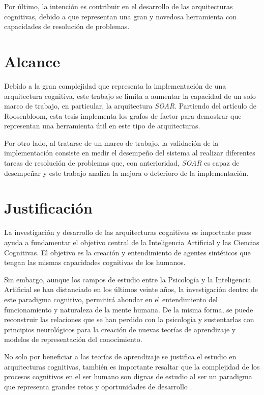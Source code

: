 Por \'{u}ltimo, la intenci\'{o}n es contribuir en el desarrollo de las arquitecturas cognitivas, debido a que representan una gran y novedosa herramienta \cite{langley1991design} con capacidades de resoluci\'{o}n de problemas. 

\section{Alcance}

Debido a la gran complejidad que representa la implementaci\'{o}n de una arquitectura cognitiva, este trabajo se limita a aumentar la capacidad de un solo marco de trabajo, en particular, la arquitectura \emph{SOAR}. Partiendo del art\'{i}culo de Roosenbloom, esta tesis implementa los grafos de factor para demostrar que representan una herramienta \'{u}til en este tipo de arquitecturas. 

Por otro lado, al tratarse de un marco de trabajo, la validaci\'{o}n de la implementaci\'{o}n consiste en medir el desempe\~no del sistema al realizar diferentes tareas de resoluci\'{o}n de problemas que, con anterioridad, \emph{SOAR} es capaz de desempe\~nar y este trabajo analiza la mejora o deterioro de la implementaci\'{o}n. 

\section{Justificaci\'{o}n}

La investigaci\'{o}n y desarrollo de las arquitecturas cognitivas es importante pues ayuda a fundamentar el objetivo central de la Inteligencia Artificial y las Ciencias Cognitivas. El objetivo es la creaci\'{o}n y entendimiento de agentes sint\'{e}ticos que tengan las mismas capacidades cognitivas de los humanos. 

Sin embargo, aunque los campos de estudio entre la Psicolog\'{i}a y la Inteligencia Artificial se han distanciado en los \'{u}ltimos veinte a\~nos, la investigaci\'{o}n dentro de este paradigma cognitivo, permitir\'{a} ahondar en el entendimiento del funcionamiento y naturaleza de la mente humana. De la misma forma, se puede reconstruir las relaciones que se han perdido con la psicolog\'{i}a y sustentarlas con principios neurol\'{o}gicos para la creaci\'{o}n de nuevas teor\'{i}as de aprendizaje y modelos de representaci\'{o}n del conocimiento.

 No solo por beneficiar a las teor\'{i}as de aprendizaje se justifica el estudio en arquitecturas cognitivas, tambi\'{e}n es importante resaltar que la complejidad de los procesos cognitivos en el ser humano son dignas de estudio al ser un paradigma que representa grandes retos y oportunidades de desarrollo \cite{langley2006intelligent} .
 
